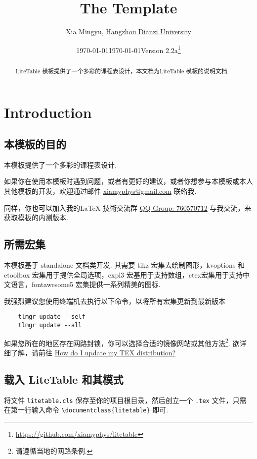 \documentclass[11pt]{article}
\title{The \pkg{LiteTable} Template}
\author[1]{Xia Mingyu, \href{https://www.hdu.edu.cn}{Hangzhou Dianzi University}}
\date{\today}
\affil[1]{\href{mailto:xiamyphys@gmail.com}{\texttt{xiamyphys@gmail.com}}}
\date{\today\quad Version 2.2a\thanks{%
  \url{https://github.com/xiamyphys/litetable}}}
\def\pkg#1{\texorpdfstring{\textcolor{pkgcolor}{\textsf{#1}}}{“#1”}}
\begin{document}
\maketitle

\vspace{-2em}
\begin{abstract}
\pkg{LiteTable} 模板提供了一个多彩的课程表设计，本文档为\pkg{LiteTable} 模板的说明文档.

\end{abstract}

\tableofcontents\clearpage

\section{Introduction}

\subsection{本模板的目的}
本模板提供了一个多彩的课程表设计. 

如果你在使用本模板时遇到问题，或者有更好的建议，或者你想参与本模板或本人其他模板的开发，欢迎通过邮件 \href{mailto:xiamyphys@gmail.com}{xiamyphys@gmail.com} 联络我.

同样，你也可以加入我的\textsf\LaTeX{} 技術交流群 \href{https://qm.qq.com/q/OnHzbNvVAG}{QQ Group: 760570712} 与我交流，来获取模板的内测版本.

\subsection{所需宏集}
本模板基于 \pkg{standalone} 文档类开发. 其需要 \pkg{tikz} 宏集去绘制图形，\pkg{kvoptions} 和 \pkg{etoolbox} 宏集用于提供全局选项，\pkg{expl3} 宏基用于支持数组，\pkg{ctex}宏集用于支持中文语言，\pkg{fontawesome5} 宏集提供一系列精美的图标.

我强烈建议您使用终端机去执行以下命令，以将所有宏集更新到最新版本
\begin{verbatim}
    tlmgr update --self
    tlmgr update --all
\end{verbatim}

如果您所在的地区存在网路封锁，你可以选择合适的镜像网站或其他方法\footnote{请遵循当地的网路条例.}. 欲详细了解，请前往 \href{https://tex.stackexchange.com/questions/55437/how-do-i-update-my-tex-distribution}{How do I update my TEX distribution?}

\subsection{载入 \pkg{LiteTable} 和其模式}
将文件 \verb|litetable.cls| 保存至你的项目根目录，然后创立一个 \verb|.tex| 文件，只需在第一行输入命令 \verb|\documentclass{litetable}| 即可.
\end{document}
